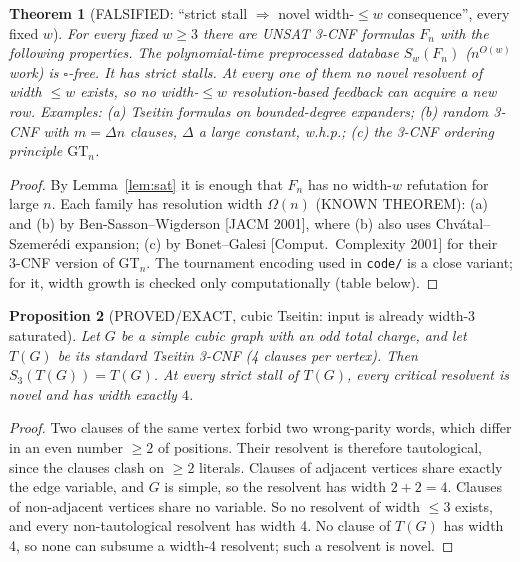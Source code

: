 \documentclass[11pt]{article}
\newtheorem{theorem}{Theorem}
\newtheorem{proposition}[theorem]{Proposition}
\theoremstyle{definition}
\begin{document}
\begin{theorem}[FALSIFIED: ``strict stall $\Rightarrow$ novel width-$\le w$ consequence'', every fixed $w$]\label{thm:main}
For every fixed $w\ge3$ there are UNSAT 3-CNF formulas $F_n$ with the following properties. The polynomial-time preprocessed database $S_w(F_n)$ ($n^{O(w)}$ work) is $\square$-free. It has strict stalls. At every one of them no novel resolvent of width $\le w$ exists, so no width-$\le w$ resolution-based feedback can acquire a new row. Examples:
(a) Tseitin formulas on bounded-degree expanders;
(b) random 3-CNF with $m=\Delta n$ clauses, $\Delta$ a large constant, w.h.p.;
(c) the 3-CNF ordering principle $\mathrm{GT}_n$.
\end{theorem}
\begin{proof}
By Lemma~\ref{lem:sat} it is enough that $F_n$ has no width-$w$ refutation for large $n$. Each family has resolution width $\Omega(n)$ (KNOWN THEOREM): (a) and (b) by Ben-Sasson--Wigderson [JACM 2001], where (b) also uses Chv\'atal--Szemer\'edi expansion; (c) by Bonet--Galesi [Comput.\ Complexity 2001] for their 3-CNF version of GT$_n$. The tournament encoding used in \texttt{code/} is a close variant; for it, width growth is checked only computationally (table below).
\end{proof}

\begin{proposition}[PROVED/EXACT, cubic Tseitin: input is already width-3 saturated]\label{prop:tseitin}
Let $G$ be a simple cubic graph with an odd total charge, and let $T(G)$ be its standard Tseitin 3-CNF (4 clauses per vertex). Then $S_3(T(G))=T(G)$. At every strict stall of $T(G)$, every critical resolvent is novel and has width exactly $4$.
\end{proposition}
\begin{proof}
Two clauses of the same vertex forbid two wrong-parity words, which differ in an even number $\ge2$ of positions. Their resolvent is therefore tautological, since the clauses clash on $\ge2$ literals. Clauses of adjacent vertices share exactly the edge variable, and $G$ is simple, so the resolvent has width $2+2=4$. Clauses of non-adjacent vertices share no variable. So no resolvent of width $\le3$ exists, and every non-tautological resolvent has width 4. No clause of $T(G)$ has width 4, so none can subsume a width-4 resolvent; such a resolvent is novel.
\end{proof}
\end{document}
